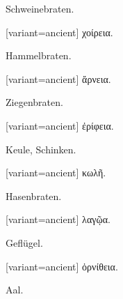 Schweinebraten. 

\egroup\switchcolumn\bgroup

\begin{greek}[variant=ancient]%
χοίρεια.

\end{greek}%
\egroup\switchcolumn*\bgroup

Hammelbraten. 

\egroup\switchcolumn\bgroup

\begin{greek}[variant=ancient]%
ἄρνεια.

\end{greek}%
\egroup\myafterpagefalse\switchcolumn*\bgroup

Ziegenbraten. 

\egroup\switchcolumn\bgroup

\begin{greek}[variant=ancient]%
ἐρίφεια.

\end{greek}%
\egroup\myafterpagefalse\switchcolumn*\bgroup

Keule, Schinken. 

\egroup\switchcolumn\bgroup

\begin{greek}[variant=ancient]%
κωλῆ.

\end{greek}%
\egroup\myafterpagefalse\switchcolumn*\bgroup

Hasenbraten. 

\egroup\switchcolumn\bgroup

\begin{greek}[variant=ancient]%
λαγῷα.

\end{greek}%
\egroup\myafterpagefalse\switchcolumn*\bgroup

Geflügel. 

\egroup\switchcolumn\bgroup

\begin{greek}[variant=ancient]%
ὀρνίθεια.

\end{greek}%
\egroup\myafterpagefalse\switchcolumn*\bgroup

Aal. 

\egroup\switchcolumn\bgroup

